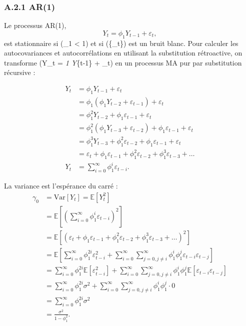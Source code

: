 \documentclass[
  letterpaper,
  DIV=11,
  numbers=noendperiod]{scrartcl}
\begin{document}
\subsubsection{A.2.1 AR(1)}\label{a.2.1-ar1}

Le processus AR(1), \[
Y_t = \phi_1 Y_{t-1} + \varepsilon_t,
\] est stationnaire si (\textbar{}\phi\_1\textbar{} \textless{} 1) et si
(\{\varepsilon\_t\}) est un bruit blanc. Pour calculer les
autocovariances et autocorrélations en utilisant la substitution
rétroactive, on transforme (Y\_t = \phi\emph{1 Y}\{t-1\} +
\varepsilon\_t) en un processus MA pur par substitution récursive :

\[
\begin{aligned}
Y_t &= \phi_1 Y_{t-1} + \varepsilon_t  \\
&= \phi_1 (\phi_1 Y_{t-2} + \varepsilon_{t-1}) + \varepsilon_t \\
&= \phi_1^2 Y_{t-2} + \phi_1 \varepsilon_{t-1} + \varepsilon_t \\
&= \phi_1^2 (\phi_1 Y_{t-3} + \varepsilon_{t-2}) + \phi_1 \varepsilon_{t-1} + \varepsilon_t \\
&= \phi_1^3 Y_{t-3} + \phi_1^2 \varepsilon_{t-2} + \phi_1 \varepsilon_{t-1} + \varepsilon_t \\
&= \varepsilon_t + \phi_1 \varepsilon_{t-1} + \phi_1^2 \varepsilon_{t-2} + \phi_1^3 \varepsilon_{t-3} + \dots \\
Y_t &= \sum_{i=0}^{\infty} \phi_1^i \varepsilon_{t-i}.
\end{aligned}
\]

La variance est l'espérance du carré : \[
\begin{aligned}
\gamma_0 &= \text{Var}[Y_t] = \mathbb{E}[Y_t^2]  \\
&= \mathbb{E}\left[\left(\sum_{i=0}^{\infty} \phi_1^i \varepsilon_{t-i}\right)^2\right] \\
&= \mathbb{E}\left[(\varepsilon_t + \phi_1 \varepsilon_{t-1} + \phi_1^2 \varepsilon_{t-2} + \phi_1^3 \varepsilon_{t-3} + \dots)^2\right] \\
&= \mathbb{E}\left[\sum_{i=0}^{\infty} \phi_1^{2i} \varepsilon_{t-i}^2 + \sum_{i=0}^{\infty} \sum_{j=0, j \neq i}^{\infty} \phi_1^i \phi_1^j \varepsilon_{t-i} \varepsilon_{t-j}\right] \\
&= \sum_{i=0}^{\infty} \phi_1^{2i} \mathbb{E}[\varepsilon_{t-i}^2] + \sum_{i=0}^{\infty} \sum_{j=0, j \neq i}^{\infty} \phi_1^i \phi_1^j \mathbb{E}[\varepsilon_{t-i} \varepsilon_{t-j}] \\
&= \sum_{i=0}^{\infty} \phi_1^{2i} \sigma^2 + \sum_{i=0}^{\infty} \sum_{j=0, j \neq i}^{\infty} \phi_1^i \phi_1^j \cdot 0 \\
&= \sum_{i=0}^{\infty} \phi_1^{2i} \sigma^2 \\
&= \frac{\sigma^2}{1 - \phi_1^2}.
\end{aligned}
\]
\end{document}
